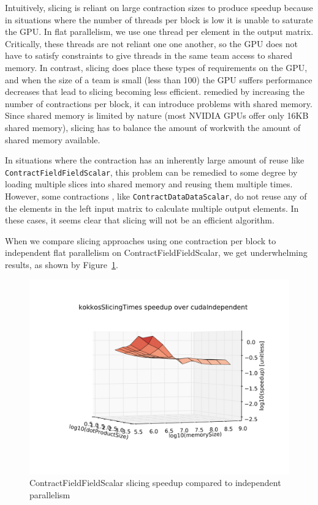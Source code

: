 Intuitively, slicing is reliant on large contraction
sizes to produce speedup because in situations where the number of threads per
block is low it is unable to saturate the GPU. In flat parallelism, we use one thread per
element in the output matrix. Critically, these threads are
not reliant one one another, so the GPU does not have to satisfy constraints to 
give threads in the same team access to shared memory. In contrast, slicing does 
place these types of requirements on the GPU, and when the size of a team is small (less than 100)
the GPU suffers performance decreases that lead to slicing becoming less efficient. 
remedied by increasing the number of contractions per block, it can introduce
problems with shared memory. Since shared memory is limited by nature (most NVIDIA GPUs offer only 16KB shared memory), slicing has to balance the amount of workwith the amount of shared memory
available.
	
    In situations where the contraction has an inherently large amount of reuse
like \texttt{ContractFieldFieldScalar}, this problem can be remedied to some degree by loading multiple slices into shared memory and reusing them multiple times. However, some 
contractions , like \texttt{ContractDataDataScalar}, do not reuse any of the elements in the left input matrix to
calculate multiple output elements. In these cases, it seems
clear that slicing will not be an efficient algorithm. 
	
When we compare slicing approaches using one contraction per block to
independent flat parallelism on ContractFieldFieldScalar, we get underwhelming
results, as shown by Figure~\ref{fig:CFFSSlicingVSIndepentent}. 

\begin{figure}[!ht] 
    \centering
    \includegraphics[scale = .15]{slicingvsindependent}
    \caption{ContractFieldFieldScalar slicing speedup compared to independent parallelism}
\label{fig:CFFSSlicingVSIndepentent}
\end{figure}


